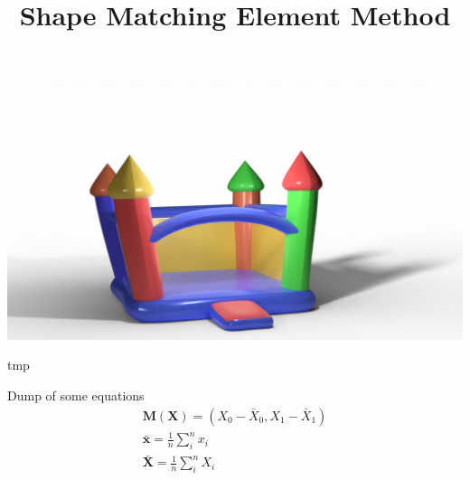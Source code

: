 \documentclass[sigconf]{acmart}
\begin{document}
\title{Shape Matching Element Method}

\begin{teaserfigure}
  \includegraphics[width=\textwidth]{castle.png}
  \caption{tmp}
  \Description{}
  \label{fig:teaser}
\end{teaserfigure}

\maketitle









Dump of some equations
\begin{align*}
    \mathbf{M(X)} = (X_0 - \bar{X}_0, X_1 - \bar{X}_1)\\
    \bar{\mathbf{x}} = \frac{1}{n}\sum_i^n x_i \\
    \bar{\mathbf{X}} = \frac{1}{n}\sum_i^n X_i \\
\end{align*}
\end{document}
